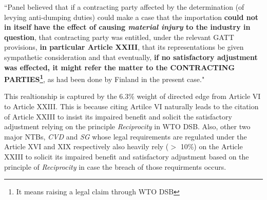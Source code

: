\begin{displayquote}[]
    ``Panel believed that if a contracting party
    affected by the determination (of levying anti-dumping duties) could make a case that the importation \textbf{could not in itself have the effect of
    causing \textit{material injury} to the industry in question}, that contracting party was entitled, under the relevant
    GATT provisions, \textbf{in particular Article XXIII}, that its representations be given sympathetic consideration
    and that eventually, \textbf{if no satisfactory adjustment was effected, it might refer the matter to the CONTRACTING
    PARTIES\footnote{It means raising a legal claim through WTO DSB}}, as had been done by Finland in the present case."
\end{displayquote}

\noindent This realtionship is captured by the $6.3\%$ weight of directed edge from Article VI to Article XXIII. This is because citing Artilce VI naturally leads to the citation of Article XXIII to insist its impaired benefit and solicit the satisfactory adjustment relying on the principle \textit{Reciprocity} in WTO DSB. 
Also, other two major NTBs, \textit{CVD} and \textit{SG} whose legal requirements are regulated under the Article XVI and XIX respectively also heavily rely ($>$ 10\%) on the Article XXIII to solicit its impaired benefit and satisfactory adjustment based on the principle of \textit{Reciprocity} in case the breach of those requirments occurs. 

